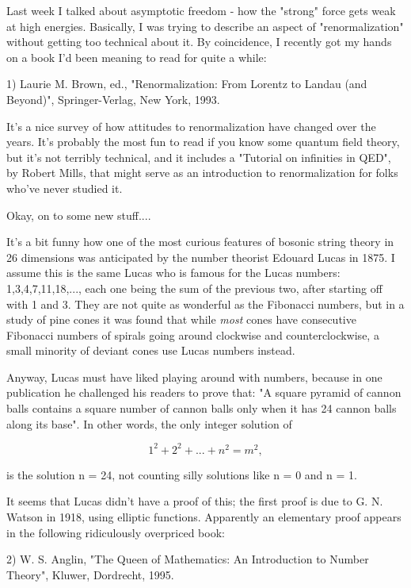 

Last week I talked about asymptotic freedom - how the "strong" force 
gets weak at high energies.   Basically, I was trying to describe an 
aspect of "renormalization" without getting too technical about it.  
By coincidence, I recently got my hands on a book I'd been meaning 
to read for quite a while:

1) Laurie M. Brown, ed., "Renormalization: From Lorentz
to Landau (and Beyond)", Springer-Verlag, New York, 1993.

It's a nice survey of how attitudes to renormalization have changed 
over the years.  It's probably the most fun to read if you know some 
quantum field theory, but it's not terribly technical, and it includes 
a "Tutorial on infinities in QED", by Robert Mills, that might serve 
as an introduction to renormalization for folks who've never studied 
it.

Okay, on to some new stuff....  

It's a bit funny how one of the most curious features of bosonic 
string theory in 26 dimensions was anticipated by the number theorist 
Edouard Lucas in 1875.  I assume this is the same Lucas who is famous 
for the Lucas numbers: 1,3,4,7,11,18,..., each one being the sum of 
the previous two, after starting off with 1 and 3.  They are not 
quite as wonderful as the Fibonacci numbers, but in a study of pine 
cones it was found that while \emph{most} cones have consecutive Fibonacci 
numbers of spirals going around clockwise and counterclockwise, a 
small minority of deviant cones use Lucas numbers instead.  

Anyway, Lucas must have liked playing around with numbers, because 
in one publication he challenged his readers to prove that: "A square 
pyramid of cannon balls contains a square number of cannon balls only
when it has 24 cannon balls along its base".  In other words, the 
only integer solution of


$$

           1^{2} + 2^{2} + ... + n^{2} = m^{2},
$$
    
is the solution n = 24, not counting silly solutions like n = 0 and
n = 1.

It seems that Lucas didn't have a proof of this; the first proof is
due to G. N. Watson in 1918, using elliptic functions.   Apparently 
an elementary proof appears in the following ridiculously overpriced book:

2) W. S. Anglin, "The Queen of Mathematics: An Introduction to
Number Theory", Kluwer, Dordrecht, 1995.

